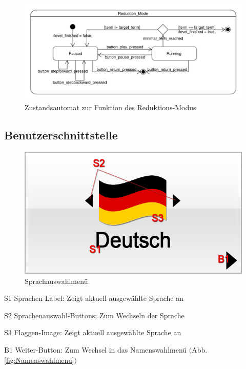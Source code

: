\begin{figure}[H]
\centering
\includegraphics[scale=0.55]{../system_models/dynamic_models/reduction_mode_state_machine.pdf}
\caption{Zustandsautomat zur Funktion des Reduktions-Modus}
\end{figure}


\subsection{Benutzerschnittstelle}


\begin{figure}[H]
\centering
\includegraphics[scale=0.55]{../gui/_jpeg_numeration/registration1.jpg}
\caption{Sprachauswahlmenü}
\label{fig:Sprachauswahlmenu}
\end{figure}
\begin{description*}
\item[S1] Sprachen-Label: Zeigt aktuell ausgewählte Sprache an
\item[S2] Sprachenauswahl-Buttons: Zum Wechseln der Sprache
\item[S3] Flaggen-Image: Zeigt aktuell ausgewählte Sprache an
\item[B1] Weiter-Button: Zum Wechsel in das Namenswahlmenü $($Abb. \ref{fig:Namenswahlmenu}$)$
\end{description*}

